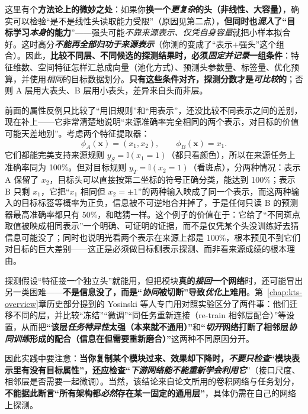 这里有个\textbf{方法论上的微妙之处}：如果你\textbf{换一个\emph{更复杂}的头（非线性、大容量）}，确实可以检验“是不是线性头读取能力受限”（原因见第二点），\textbf{但同时也\emph{混入}了“目标学习\emph{本身}的能力}”——强头可能\emph{不靠来源表示、仅凭自身容量}就把小样本拟合好。这时高分\textbf{\emph{不能再全部归功于来源表示}}（你测的变成了“表示+强头”这个组合）。因此，\textbf{比较不同层、不同候选的探测结果时，必须\emph{固定并记录}一组条件}：特征维数、空间特征怎样汇总成向量（池化方式）、预测头参数量、标签量、优化预算，并使用\emph{相同}的目标数据划分。\textbf{只有这些条件对齐，探测分数才是\emph{可比较}的}；否则 A 层用大表头、B 层用小表头，差异来自头而非层。

前面的属性反例只比较了“用旧规则”和“用表示”，还没比较不同表示之间的差别，现在补上——它非常清楚地说明“来源准确率完全相同的两个表示，对目标的价值可能天差地别”。考虑两个特征提取器：
\[ \phi_A(\bm{x})=(x_1,x_2),\qquad \phi_B(\bm{x})=x_1. \]
它们都能完美支持来源规则 $y_S=\mathbb{I}(x_1=1)$（都只看颜色），所以在来源任务上准确率同为 100\%。但对目标规则 $y_T=\mathbb{I}(x_2=1)$（看斑点），分两种情况：表示 A 保留了 $x_2$，目标头可以直接按第二坐标的符号正确分类，能达到 100\%；表示 B 只剩 $x_1$，它把“$x_1$ 相同但 $x_2=\pm1$”的两种输入映成了同一个表示，而这两种输入的目标标签等概率为正负，信息被不可逆地合并掉了，于是任何只读 B 的预测器最高准确率都只有 50\%，和瞎猜一样。这个例子的价值在于：它给了“不同斑点取值被映成相同表示”一个明确、可证明的证据，而不是仅凭某个头没训练好去猜信息可能没了；同时也说明光看两个表示在来源上都是 100\%，根本预见不到它们对目标的巨大差别——这正是必须做目标侧表示探测、而非看来源成绩的根本理由。

探测假设“特征接一个独立头”就能用，但把模块\textbf{真的\emph{接回}一个网络}时，还可能冒出另一类困难——\textbf{不是信息没了，而是“\emph{协同}被切断”导致\emph{优化}上难用}。第~\ref{chap:kts-overview}章历史部分提到的 Yosinski 等人专门用对照实验区分了两件事：他们迁移不同的层，并比较“冻结”“微调”“同任务重新连接（re-train 相邻层配合）”等设置，从而把\textbf{“该层\emph{任务特异性}太强（本来就不通用）”}和\textbf{“\emph{切开}网络打断了相邻层\emph{协同训练}形成的配合（信息在但需要重新磨合）”}这两种不同原因分开。

因此实践中要注意：\textbf{当你复制某个模块过来、效果却下降时，\emph{不要只检查}“模块表示里有没有目标属性”，还应检查“\emph{下游网络能不能\emph{重新学会利用}它}}”（接口尺度、相邻层是否需要一起微调）。当然，该结论来自论文所用的卷积网络与任务划分，\textbf{不能据此断言“所有架构都\emph{必然}存在某一固定的通用层”}，具体仍需在自己的网络上探测。

